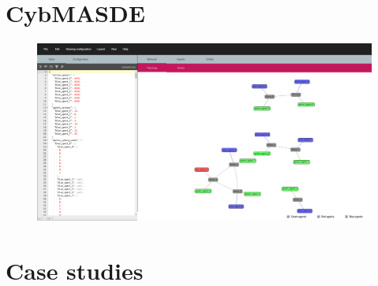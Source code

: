 

\section{CybMASDE}

\begin{frame}
    \begin{figure}
        \centering
        \includegraphics[width=\linewidth]{figures/mcas_overview.png}
    \end{figure}
\end{frame}

\section{Case studies}



